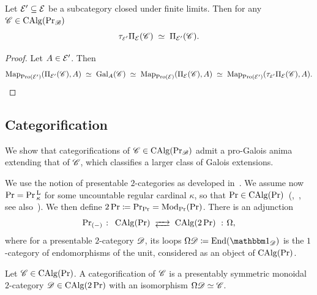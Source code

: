 \documentclass[english,svgnames,table]{article}
\begin{document}
    \begin{lemma}
    \label{lem:T-truncation-of-Galois-anima}
        Let $\cT' \subseteq \cT$ be a subcategory closed under finite limits. Then for any $\cC \in \CAlgB$
        \begin{equation*}
            \tau_{\scriptscriptstyle\cT'} \piT(\cC) \;\simeq\; \piT[\cT'](\cC).
        \end{equation*}
    \end{lemma}
    \begin{proof}
        Let $A \in \cT'$. Then
        \begin{equation*}
            \Map_{\Pro(\cT')}(\piT[\cT'](\cC), A) \;\simeq\; \Gal_A(\cC) \;\simeq\; \Map_{\Pro(\cT)}(\piT(\cC), A) \;\simeq\; \Map_{\Pro(\cT')}(\tau_{\scriptscriptstyle\cT'} \piT(\cC), A).
        \end{equation*}
    \end{proof}

\subsection{Categorification}
\label{subsec:categorification}
    We show that categorifications of $\cC \in \CAlg(\ModB)$ admit a pro-Galois anima extending that of $\cC$, which classifies a larger class of Galois extensions.

    We use the notion of presentable $2$-categories as developed in~\cite{stefanich-2020-presentable,Aoki-2025-higher-presentable,Scholze-2026-Gestalten}.
    We assume now $\Pr = \PrL_{\kappa}$ for some uncountable regular cardinal $\kappa$, so that $\Pr \in \CAlg(\Pr)$~(\cite{Campion-2022-presentable},~\cite[Proposition~2.3]{Aoki-2025-higher-presentable}, see also~\cite[Theorem~3.11]{Scholze-2026-Gestalten}). We then define $2\Pr \coloneq \ModC[\Pr] = \Mod_{\Pr}(\Pr)$.
    There is an adjunction
    \begin{equation*}
        \ModC[(-)] \;\colon\; \CAlg(\Pr) \;\longadj\; \CAlg(2\Pr) \;\cocolon\; \Omega,
    \end{equation*}
    where for a presentable $2$-category $\cD$, its loops $\Omega \cD \coloneq \End(\ounit_{\cD})$ is the $1$-category of endomorphisms of the unit, considered as an object of $\CAlg(\Pr)$.
    
    \begin{definition}
        Let $\cC \in \CAlg(\Pr)$. A categorification of $\cC$ is a presentably symmetric monoidal $2$-category $\cD \in \CAlg(2\Pr)$ with an isomorphism $\Omega \cD \simeq \cC$.
    \end{definition}
    
\end{document}

